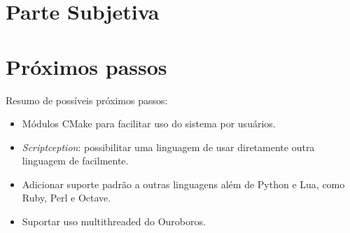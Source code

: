 \chapter*{Parte Subjetiva}
\label{sec:parte_subjetiva}

\newcommand\materia[3]{\noindent \textbf{#1} - \texttt{#2}\\\indent #3\vspace{0.5cm}\\}





\chapter{Próximos passos}
\label{sec:proximos_passos}

Resumo de possíveis próximos passos:
\begin{itemize}
  \item Módulos CMake para facilitar uso do sistema por usuários.
  \item \emph{Scriptception}: possibilitar uma linguagem de \script{} usar diretamente
    outra linguagem de \script{} facilmente.
  \item Adicionar suporte padrão a outras linguagens além de Python e Lua, como Ruby, Perl
    e Octave.
  \item Suportar uso multithreaded do Ouroboros.
\end{itemize}
